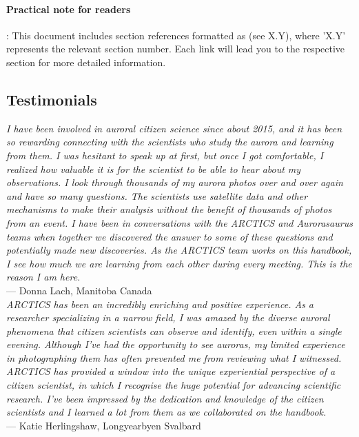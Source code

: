 \documentclass{article}
\begin{document}
\paragraph{Practical note for readers}: This document includes section references formatted as (see X.Y), where 'X.Y' represents the relevant section number. Each link will lead you to the respective section for more detailed information.

\subsection{Testimonials}

\textit{I have been involved in auroral citizen science since about 2015, and it has been so rewarding connecting with the scientists who study the aurora and learning from them. I was hesitant to speak up at first, but once I got comfortable, I realized how valuable it is for the scientist to be able to hear about my observations. I look through thousands of my aurora photos over and over again and have so many questions. The scientists use satellite data and other mechanisms to make their analysis without the benefit of thousands of photos from an event. I have been in conversations with the ARCTICS and Aurorasaurus teams when together we discovered the answer to some of these questions and potentially made new discoveries. As the ARCTICS team works on this handbook, I see how much we are learning from each other during every meeting. This is the reason I am here.
}\\

--- Donna Lach, Manitoba Canada\\

\textit{ARCTICS has been an incredibly enriching and positive experience. As a researcher specializing in a narrow field, I was amazed by the diverse auroral phenomena that citizen scientists can observe and identify, even within a single evening. Although I’ve had the opportunity to see auroras, my limited experience in photographing them has often prevented me from reviewing what I witnessed. ARCTICS has provided a window into the unique experiential perspective of a citizen scientist, in which I recognise the huge potential for advancing scientific research. I’ve been impressed by the dedication and knowledge of the citizen scientists and I learned a lot from them as we collaborated on the handbook.}\\

--- Katie Herlingshaw, Longyearbyen Svalbard
\end{document}
